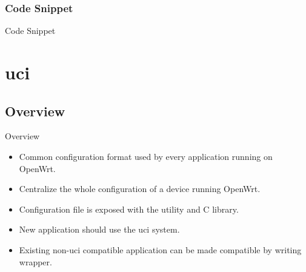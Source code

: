 \subsubsection{Code Snippet}
\begin{frame}{Code Snippet}
    
\end{frame}

\section{uci}

\subsection{Overview}
\begin{frame}{Overview}
    \begin{itemize}[<+-|alert@+>]
        \item Common configuration format used by every application running on OpenWrt.
        \item Centralize the whole configuration of a device running OpenWrt.
        \item Configuration file is exposed with the  utility and  C library.
        \item New application should use the uci system.
        \item Existing non-uci compatible application can be made compatible by writing wrapper.
    \end{itemize}
\end{frame}

